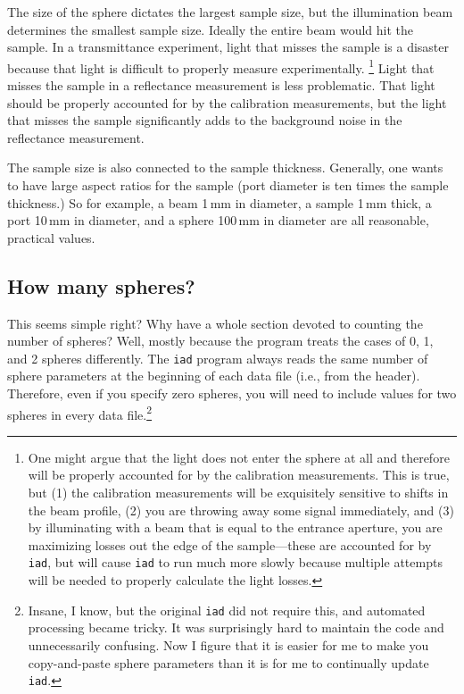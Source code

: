 \documentclass{article}
\newcommand\iadprog{\texttt{iad}}
\begin{document}
The size of the sphere dictates the largest sample size, but the illumination
beam determines the smallest sample size.  Ideally the entire beam would hit the
sample.  In a transmittance experiment, light that misses the sample is a
disaster because that light is difficult to properly measure experimentally.%
\footnote{One might argue that the light does not enter the sphere at all and therefore
will be properly accounted for by the calibration measurements.  This is true, but
(1) the calibration measurements will be exquisitely sensitive to shifts in the beam
profile, (2) you are throwing away some signal immediately, and (3) by illuminating
with a beam that is equal to the entrance aperture, you are maximizing losses out
the edge of the sample---these are accounted for by \iadprog{}, but will cause 
\iadprog{} to run much more slowly because multiple attempts will be needed to
properly calculate the light losses.}
Light that misses the sample in a reflectance measurement is less problematic.
That light should be properly accounted for by the calibration measurements, but
the light that misses the sample significantly adds to the background noise
in the reflectance measurement.

The sample size is also connected to the sample thickness.  Generally, one
wants to have large aspect ratios for the sample (port diameter is ten times
the sample thickness.)  So for example, a beam 1\,mm in diameter, 
a sample 1\,mm thick, a port 10\,mm in diameter, and a sphere 100\,mm in diameter 
are all reasonable, practical values.

\subsection{How many spheres?}

This seems simple right?  Why have a whole section devoted to counting the number 
of spheres?  Well, mostly because the program treats the cases of 0, 1, and 2
spheres differently.  The \iadprog{} program always reads the same number of sphere parameters at the beginning of each data file (i.e., from the header).  Therefore, even
if you specify zero spheres, you will need to include values for two spheres 
in every data file.\footnote{Insane, I know, but the original \iadprog{} did not require this,
and automated processing became tricky.  It was surprisingly
hard to maintain the code and unnecessarily confusing.  Now I figure that it is easier
for me to make you copy-and-paste sphere parameters than it is for me to continually update
\iadprog{}.}
\end{document}
